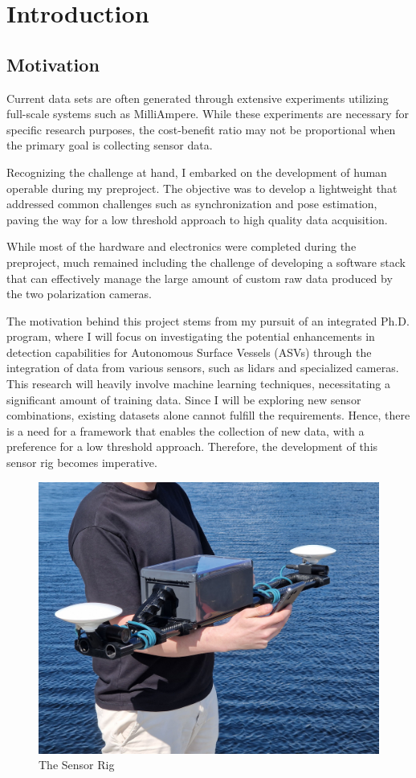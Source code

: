 \chapter{Introduction}

\section{Motivation}
Current data sets are often generated through extensive experiments utilizing full-scale systems such as MilliAmpere.
While these experiments are necessary for specific research purposes, the cost-benefit ratio may not be proportional when the primary goal is collecting sensor data.

Recognizing the challenge at hand, I embarked on the development of human operable \sr during my preproject.
The objective was to develop a lightweight \sr that addressed common challenges such as synchronization and pose estimation, paving the way for a low threshold approach to high quality data acquisition.

While most of the hardware and electronics were completed during the preproject, much remained including the challenge of developing a software stack that can effectively manage the large amount of custom raw data produced by the two polarization cameras.




The motivation behind this project stems from my pursuit of an integrated Ph.D.
program, where I will focus on investigating the potential enhancements in detection capabilities for Autonomous Surface Vessels (ASVs) through the integration of data from various sensors, such as lidars and specialized cameras.
This research will heavily involve machine learning techniques, necessitating a significant amount of training data.
Since I will be exploring new sensor combinations, existing datasets alone cannot fulfill the requirements.
Hence, there is a need for a framework that enables the collection of new data, with a preference for a low threshold approach.
Therefore, the development of this sensor rig becomes imperative.


\begin{figure}
    \includegraphics[width=\textwidth]{figures/frontpage.jpg}
    \caption{The Sensor Rig}
\end{figure}
